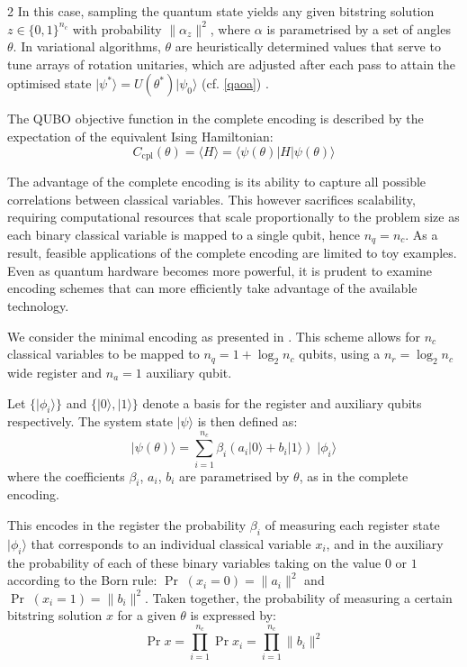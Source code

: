 \documentclass [10pt]{article}
\newcommand {\qvec}[1] {\vert #1 \rangle}
\newcommand {\qcovec}[1] {\langle #1 \vert}
\newcommand {\qeval}[1] {\langle #1 \rangle}
\newcommand {\qnorm}[1] {\lVert #1 \rVert}
\begin{document}
\begin {multicols}{2}
In this case, sampling the quantum state yields any given bitstring solution
${z \in \{0, 1\}^{n_c}}$ with probability $\qnorm{\alpha_z}^2$, where
$\alpha$ is parametrised by a set of angles $\theta$. In variational
algorithms, $\theta$ are heuristically determined values that serve to tune
arrays of rotation unitaries, which are adjusted after each pass to attain
the optimised state $\qvec{\psi^*} = U(\theta^*)\qvec{\psi_0}$
(cf. \eqref{qaoa}) \cite{qaoaintro}.

The QUBO objective function in the complete encoding is described by the
expectation of the equivalent Ising Hamiltonian:
\begin {equation}
C_{\text{cpl}}(\theta) = \qeval{H} = \qcovec{\psi(\theta)} H \qvec{\psi(\theta)}
\end {equation}


The advantage of the complete encoding is its ability to capture all
possible correlations between classical variables. This however sacrifices
scalability, requiring computational resources that scale proportionally
to the problem size as each binary classical variable is mapped to a
single qubit, hence $n_q = n_c$. As a result, feasible applications of the
complete encoding are limited to toy examples. Even as quantum hardware
becomes more powerful, it is prudent to examine encoding schemes that can more
efficiently take advantage of the available technology.

We consider the minimal encoding as presented in \cite{effbinopt}. This scheme
allows for $n_c$ classical variables to be mapped to $n_q = 1 + \log_2 n_c$
qubits, using a $n_r = \log_2 n_c$ wide register and $n_a = 1$ auxiliary
qubit.

Let $\{\qvec{\phi_i}\}$ and $\{\qvec{0}, \qvec{1}\}$ denote a basis for the
register and auxiliary qubits respectively. The system state $\qvec{\psi}$ is
then defined as:
\begin {equation}
\qvec{\psi(\theta)} = \sum_{i=1}^{n_c} \beta_i
(a_i \qvec{0} + b_i \qvec{1}) \; \qvec{\phi_i}
\end {equation}
where the coefficients $\beta_i$, $a_i$, $b_i$ are parametrised by $\theta$,
as in the complete encoding.

This encodes in the register the probability $\beta_i$ of measuring each
register state $\qvec{\phi_i}$ that corresponds to an individual classical
variable $x_i$, and in the auxiliary the probability of each of these binary
variables taking on the value $0$ or $1$ according to the Born rule:
$\Pr \; (x_i = 0) = \qnorm{a_i}^2$ and $\Pr \; (x_i = 1) = \qnorm{b_i}^2$.
Taken together, the probability of measuring a certain bitstring solution
$x$ for a given $\theta$ is expressed by:
\begin {equation}
\label {prob}
\Pr x = \prod_{i=1}^{n_c} \Pr x_i = \prod_{i=1}^{n_c} \qnorm{b_i}^2
\end {equation}


\end{multicols}
\end{document}
